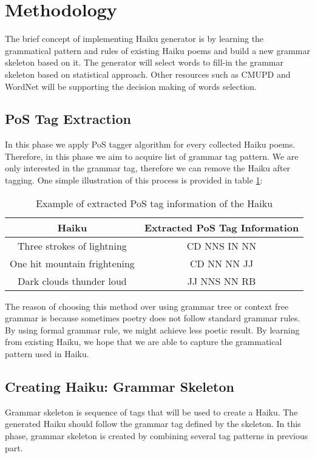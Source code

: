 \section{Methodology}

The brief concept of implementing Haiku generator is by learning the grammatical pattern and rules of existing Haiku poems and build a new grammar skeleton based on it. The generator will select words to fill-in the grammar skeleton based on statistical approach. Other resources such as CMUPD and WordNet will be supporting the decision making of words selection.

\subsection{PoS Tag Extraction}

In this phase we apply PoS tagger algorithm for every collected Haiku poems. Therefore, in this phase we aim to acquire list of grammar tag pattern. We are only interested in the grammar tag, therefore we can remove the Haiku after tagging. One simple illustration of this process is provided in table \ref{exmpl}:

\begin{table}[h]
	\centering
	\begin{tabular}{|c|c|}
		\hline Haiku & Extracted PoS Tag Information \\
		\hline Three strokes of lightning & CD NNS IN NN \\ 
		One hit mountain frightening &  CD NN NN JJ  \\ 
		Dark clouds thunder loud &  JJ NNS NN RB \\ 
		\hline
	\end{tabular} 
	\caption{Example of extracted PoS tag information of the Haiku}
	\label{exmpl}
\end{table}
	
The reason of choosing this method over using grammar tree or context free grammar is because sometimes poetry does not follow standard grammar rules. By using formal grammar rule, we might achieve less poetic result. By learning from existing Haiku, we hope that we are able to capture the grammatical pattern used in Haiku.

\subsection{Creating Haiku: Grammar Skeleton}

Grammar skeleton is sequence of tags that will be used to create a Haiku. The generated Haiku should follow the grammar tag defined by the skeleton. In this phase, grammar skeleton is created by combining several tag patterns in previous part.



